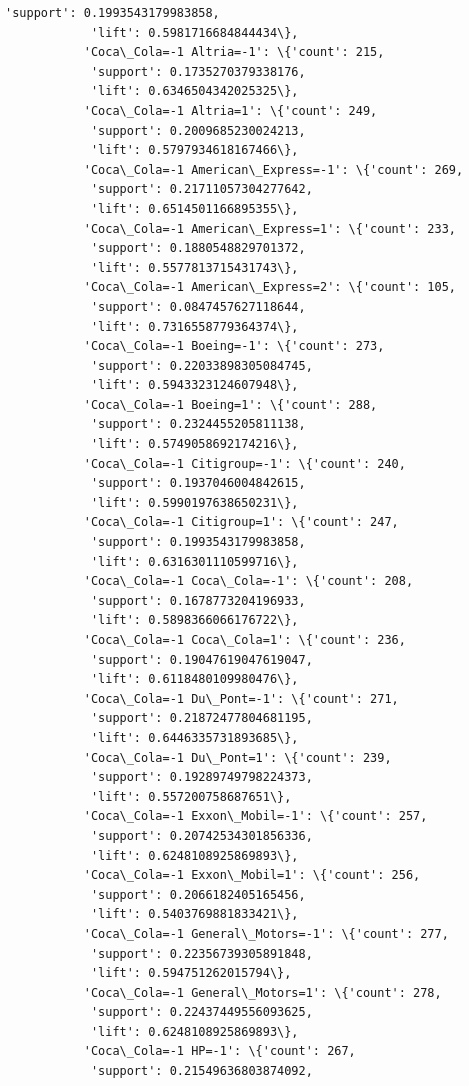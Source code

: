 \documentclass[11pt]{article}
\begin{document}
\begin{Verbatim}[commandchars=\\\{\}]
            'support': 0.1993543179983858,
            'lift': 0.5981716684844434\},
           'Coca\_Cola=-1 Altria=-1': \{'count': 215,
            'support': 0.1735270379338176,
            'lift': 0.6346504342025325\},
           'Coca\_Cola=-1 Altria=1': \{'count': 249,
            'support': 0.2009685230024213,
            'lift': 0.5797934618167466\},
           'Coca\_Cola=-1 American\_Express=-1': \{'count': 269,
            'support': 0.21711057304277642,
            'lift': 0.6514501166895355\},
           'Coca\_Cola=-1 American\_Express=1': \{'count': 233,
            'support': 0.1880548829701372,
            'lift': 0.5577813715431743\},
           'Coca\_Cola=-1 American\_Express=2': \{'count': 105,
            'support': 0.0847457627118644,
            'lift': 0.7316558779364374\},
           'Coca\_Cola=-1 Boeing=-1': \{'count': 273,
            'support': 0.22033898305084745,
            'lift': 0.5943323124607948\},
           'Coca\_Cola=-1 Boeing=1': \{'count': 288,
            'support': 0.2324455205811138,
            'lift': 0.5749058692174216\},
           'Coca\_Cola=-1 Citigroup=-1': \{'count': 240,
            'support': 0.1937046004842615,
            'lift': 0.5990197638650231\},
           'Coca\_Cola=-1 Citigroup=1': \{'count': 247,
            'support': 0.1993543179983858,
            'lift': 0.6316301110599716\},
           'Coca\_Cola=-1 Coca\_Cola=-1': \{'count': 208,
            'support': 0.1678773204196933,
            'lift': 0.5898366066176722\},
           'Coca\_Cola=-1 Coca\_Cola=1': \{'count': 236,
            'support': 0.19047619047619047,
            'lift': 0.6118480109980476\},
           'Coca\_Cola=-1 Du\_Pont=-1': \{'count': 271,
            'support': 0.21872477804681195,
            'lift': 0.6446335731893685\},
           'Coca\_Cola=-1 Du\_Pont=1': \{'count': 239,
            'support': 0.19289749798224373,
            'lift': 0.557200758687651\},
           'Coca\_Cola=-1 Exxon\_Mobil=-1': \{'count': 257,
            'support': 0.20742534301856336,
            'lift': 0.6248108925869893\},
           'Coca\_Cola=-1 Exxon\_Mobil=1': \{'count': 256,
            'support': 0.2066182405165456,
            'lift': 0.5403769881833421\},
           'Coca\_Cola=-1 General\_Motors=-1': \{'count': 277,
            'support': 0.22356739305891848,
            'lift': 0.594751262015794\},
           'Coca\_Cola=-1 General\_Motors=1': \{'count': 278,
            'support': 0.22437449556093625,
            'lift': 0.6248108925869893\},
           'Coca\_Cola=-1 HP=-1': \{'count': 267,
            'support': 0.21549636803874092,

\end{Verbatim}
\end{document}
